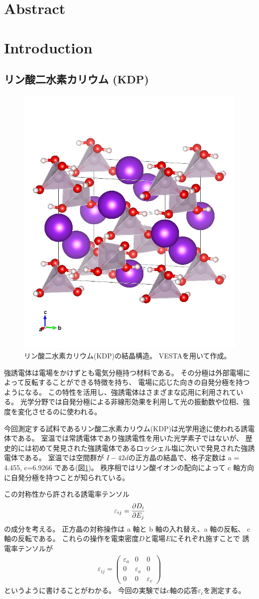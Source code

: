 \documentclass[9pt,dvipdfmx,a4paper]{jsarticle}
\begin{document}

\section{Abstract}

\section{Introduction}
\subsection*{リン酸二水素カリウム (KDP)}
\begin{figure}
    \centering
    \includegraphics[width = 0.3\columnwidth]{KDP_tetragonal.png}
    \caption{\small{リン酸二水素カリウム(KDP)の結晶構造\cite{cif:7020834}。
    VESTAを用いて作成\cite{VESTA}。}}
    \label{fig:KDP_lattice}
\end{figure}
強誘電体は電場をかけずとも電気分極持つ材料である。
その分極は外部電場によって反転することができる特徴を持ち、
電場に応じた向きの自発分極を持つようになる。
この特性を活用し、強誘電体はさまざまな応用に利用されている。
光学分野では自発分極による非線形効果を利用して光の振動数や位相、強度を変化させるのに使われる。

今回測定する試料であるリン酸二水素カリウム(KDP)は光学用途に使われる誘電体である。
室温では常誘電体であり強誘電性を用いた光学素子ではないが、
歴史的には初めて発見された強誘電体であるロッシェル塩に次いで発見された強誘電体である。
室温では空間群が \(I-4 2 d\)の正方晶の結晶で、格子定数は a = 4.455, c=6.9266 である(図\ref{fig:KDP_lattice})。
秩序相ではリン酸イオンの配向によって c 軸方向に自発分極を持つことが知られている\cite{onodera}。

この対称性から許される誘電率テンソル
\begin{align}
    \varepsilon_{ij}=\pdv{D_i}{E_j}
\end{align}
の成分を考える。
正方晶の対称操作は a 軸と b 軸の入れ替え、a 軸の反転、 c 軸の反転である。
これらの操作を電束密度\(D\)と電場\(E\)にそれぞれ施すことで
誘電率テンソルが
\begin{align}
    \varepsilon_{ij}=
    \begin{pmatrix}
        \varepsilon_a & 0 & 0\\
        0 & \varepsilon_a & 0\\
        0 & 0 & \varepsilon_c
    \end{pmatrix}
\end{align}
というように書けることがわかる。
今回の実験ではc軸の応答\(\varepsilon_c\)を測定する。
\end{document}
